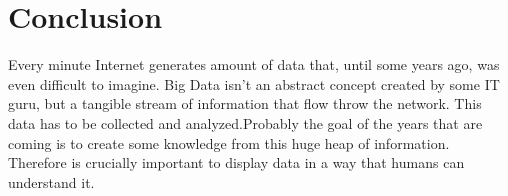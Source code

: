 \documentclass[a4paper,13pt]{report}
\begin{document}
\section{Conclusion}
Every minute Internet generates amount of data that, until some years ago, was even difficult to imagine. Big Data isn't an abstract concept created by some IT guru, but a tangible stream of information that flow throw the network. This data has to be collected and analyzed.Probably the goal of the years that are coming is to create some knowledge from this huge heap of information. Therefore is crucially important to display data in a way that humans can understand it.
\cleardoublepage
{}

\end{document}
